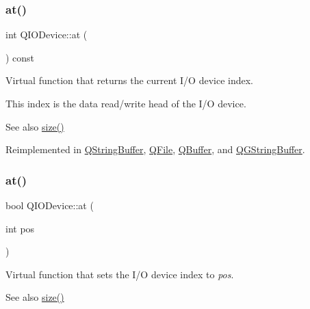\subsubsection{\texorpdfstring{at()}{at()}\hspace{0.1cm}{\footnotesize\ttfamily [1/2]}}
{\footnotesize\ttfamily int Q\+I\+O\+Device\+::at (\begin{DoxyParamCaption}{ }\end{DoxyParamCaption}) const\hspace{0.3cm}{\ttfamily [virtual]}}

Virtual function that returns the current I/O device index.

This index is the data read/write head of the I/O device.

\begin{DoxySeeAlso}{See also}
\mbox{\hyperlink{class_q_i_o_device_a60c4146763625213ac7aa29f1f071592}{size()}} 
\end{DoxySeeAlso}


Reimplemented in \mbox{\hyperlink{class_q_string_buffer_ad5305aacadba80e595b741142f67538e}{Q\+String\+Buffer}}, \mbox{\hyperlink{class_q_file_aa156f3896b35b0c6f6e9cf9237bf34bf}{Q\+File}}, \mbox{\hyperlink{class_q_buffer_adbff1cb0375ac6bc27621d26450c6c0a}{Q\+Buffer}}, and \mbox{\hyperlink{class_q_g_string_buffer_a8aa888c83b2a77c20fb60fa7d07a143b}{Q\+G\+String\+Buffer}}.

\mbox{\label{class_q_i_o_device_a14643fc1c2e05c2addd1ecc03bd98017}} 
\subsubsection{\texorpdfstring{at()}{at()}\hspace{0.1cm}{\footnotesize\ttfamily [2/2]}}
{\footnotesize\ttfamily bool Q\+I\+O\+Device\+::at (\begin{DoxyParamCaption}\item[{int}]{pos }\end{DoxyParamCaption})\hspace{0.3cm}{\ttfamily [virtual]}}

Virtual function that sets the I/O device index to {\itshape pos}. \begin{DoxySeeAlso}{See also}
\mbox{\hyperlink{class_q_i_o_device_a60c4146763625213ac7aa29f1f071592}{size()}} 
\end{DoxySeeAlso}


